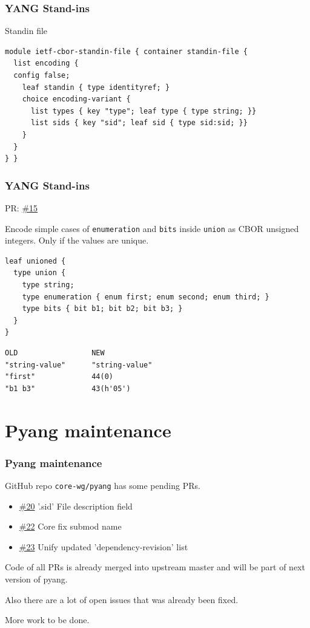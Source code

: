 \documentclass{beamer}
\begin{document}
\begin{frame}[fragile]
	\frametitle{YANG Stand-ins}
	
	\begin{block}{Standin file}
	\begin{verbatim}
module ietf-cbor-standin-file { container standin-file {
  list encoding {
  config false;
    leaf standin { type identityref; }
    choice encoding-variant {
      list types { key "type"; leaf type { type string; }}
      list sids { key "sid"; leaf sid { type sid:sid; }}
    }
  }
} }
	\end{verbatim}
	\end{block}

\end{frame}

\begin{frame}[fragile]
	\frametitle{YANG Stand-ins}
	
	PR: \href{https://github.com/cabo/yang-standin/pull/15}{\#15}
	
	Encode simple cases of \verb|enumeration| and \verb|bits| inside \verb|union|
	as CBOR unsigned integers.
	Only if the values are unique.
\begin{verbatim}
leaf unioned {
  type union {
    type string;
    type enumeration { enum first; enum second; enum third; }
    type bits { bit b1; bit b2; bit b3; }  
  }
}
\end{verbatim}

\begin{verbatim}
OLD                 NEW
"string-value"      "string-value"
"first"             44(0)
"b1 b3"             43(h'05')
\end{verbatim}
\end{frame}

\section{Pyang maintenance}
\begin{frame}[fragile]
	\frametitle{Pyang maintenance}
	GitHub repo \verb|core-wg/pyang| has some pending PRs.
	
	\begin{itemize}
	  \item \href{https://github.com/core-wg/pyang/pull/20}{\#20} '.sid' File description field
	  \item \href{https://github.com/core-wg/pyang/pull/22}{\#22} Core fix submod name
	  \item \href{https://github.com/core-wg/pyang/pull/23}{\#23} Unify updated 'dependency-revision' list
	\end{itemize}
	Code of all PRs is already merged into upstream master and will be part of
	next version of pyang.

	Also there are a lot of open issues that was already been fixed.
	
	More work to be done.
\end{frame}
\end{document}

